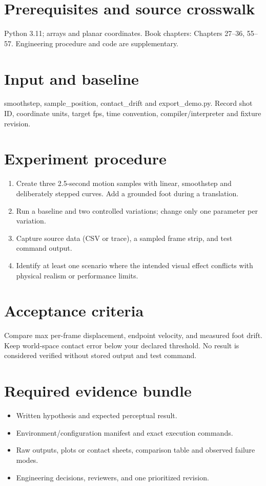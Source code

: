 \documentclass[10pt,letterpaper]{article}
\begin{document}
\makedoctitle
\makedocsummary

\section{Prerequisites and source crosswalk}
Python 3.11; arrays and planar coordinates. Book chapters: Chapters 27--36, 55--57. Engineering procedure and code are supplementary.
\section{Input and baseline}
smoothstep, sample\_position, contact\_drift and export\_demo.py. Record shot ID, coordinate units, target fps, time convention, compiler/interpreter and fixture revision.
\section{Experiment procedure}
\begin{enumerate}
\item Create three 2.5-second motion samples with linear, smoothstep and deliberately stepped curves. Add a grounded foot during a translation.
\item Run a baseline and two controlled variations; change only one parameter per variation.
\item Capture source data (CSV or trace), a sampled frame strip, and test command output.
\item Identify at least one scenario where the intended visual effect conflicts with physical realism or performance limits.
\end{enumerate}
\section{Acceptance criteria}
Compare max per-frame displacement, endpoint velocity, and measured foot drift. Keep world-space contact error below your declared threshold. No result is considered verified without stored output and test command.
\section{Required evidence bundle}
\begin{itemize}
\item Written hypothesis and expected perceptual result.
\item Environment/configuration manifest and exact execution commands.
\item Raw outputs, plots or contact sheets, comparison table and observed failure modes.
\item Engineering decisions, reviewers, and one prioritized revision.
\end{itemize}
\end{document}
